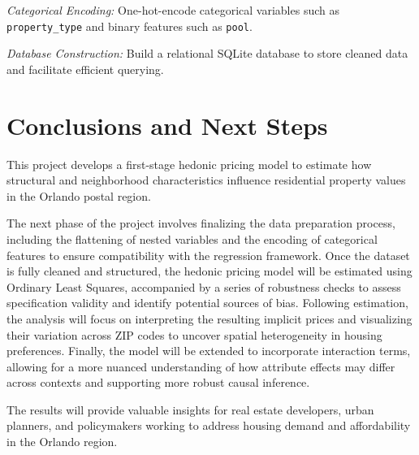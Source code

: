 \documentclass[11pt]{article}
\begin{document}
\textit{Categorical Encoding:} One-hot-encode categorical variables such as \texttt{property\_type} and binary features such as \texttt{pool}.
    
\textit{Database Construction:} Build a relational SQLite database to store cleaned data and facilitate efficient querying.



\section{Conclusions and Next Steps}

This project develops a first-stage hedonic pricing model to estimate how structural and neighborhood characteristics influence residential property values in the Orlando postal region. 

 The next phase of the project involves finalizing the data preparation process, including the flattening of nested variables and the encoding of categorical features to ensure compatibility with the regression framework. Once the dataset is fully cleaned and structured, the hedonic pricing model will be estimated using Ordinary Least Squares, accompanied by a series of robustness checks to assess specification validity and identify potential sources of bias. Following estimation, the analysis will focus on interpreting the resulting implicit prices and visualizing their variation across ZIP codes to uncover spatial heterogeneity in housing preferences. Finally, the model will be extended to incorporate interaction terms, allowing for a more nuanced understanding of how attribute effects may differ across contexts and supporting more robust causal inference.


The results will provide valuable insights for real estate developers, urban planners, and policymakers working to address housing demand and affordability in the Orlando region.



	
\clearpage
\nocite{*}


	
\end{document}
